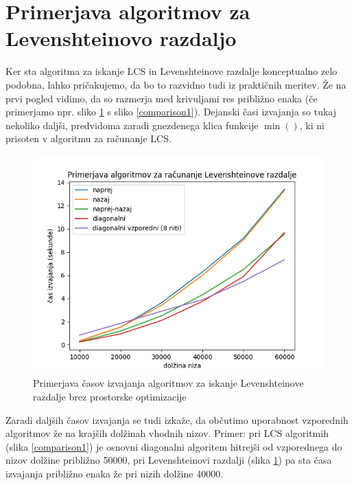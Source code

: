 \documentclass[a4paper,12pt,openright]{book}
\begin{document}
\section{Primerjava algoritmov za Levenshteinovo razdaljo}

Ker sta algoritma za iskanje LCS in Levenshteinove razdalje konceptualno zelo podobna, lahko pričakujemo, da bo to razvidno tudi iz praktičnih meritev. Že na prvi pogled vidimo, da so razmerja med krivuljami res približno enaka (če primerjamo npr. sliko \ref{comparison4} s sliko \ref{comparison1}). Dejanski časi izvajanja so tukaj nekoliko daljši, predvidoma zaradi gnezdenega klica funkcije $\min()$, ki ni prisoten v algoritmu za računanje LCS. 

\begin{figure}[htb]
\centering
\includegraphics[width=1.0\textwidth]{plots/LevenshteinTotal.png}
\caption{Primerjava časov izvajanja algoritmov za iskanje Levenshteinove razdalje brez prostorske optimizacije}
\label{comparison4}
\end{figure}

Zaradi daljših časov izvajanja se tudi izkaže, da občutimo uporabnost vzporednih algoritmov že na krajših dolžinah vhodnih nizov. Primer: pri LCS algoritmih (slika \ref{comparison1}) je osnovni diagonalni algoritem hitrejši od vzporednega do nizov dolžine približno 50000, pri Levenshteinovi razdalji (slika \ref{comparison4}) pa sta časa izvajanja približno enaka že pri nizih dolžine 40000. 
\end{document}
